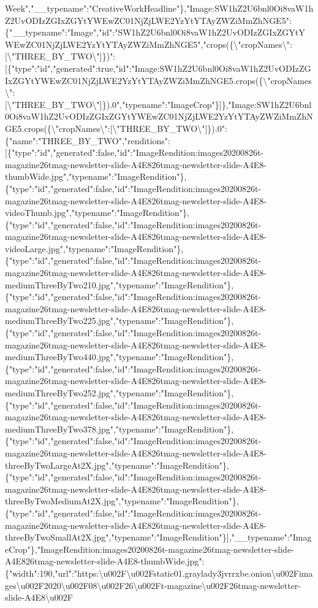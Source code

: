 Week","\_\_typename":"CreativeWorkHeadline"\},"Image:SW1hZ2U6bnl0Oi8vaW1hZ2UvODIzZGIxZGYtYWEwZC01NjZjLWE2YzYtYTAyZWZiMmZhNGE5":\{"\_\_typename":"Image","id":"SW1hZ2U6bnl0Oi8vaW1hZ2UvODIzZGIxZGYtYWEwZC01NjZjLWE2YzYtYTAyZWZiMmZhNGE5","crops(\{\textbackslash{}"cropNames\textbackslash{}":{[}\textbackslash{}"THREE\_BY\_TWO\textbackslash{}"{]}\})":{[}\{"type":"id","generated":true,"id":"Image:SW1hZ2U6bnl0Oi8vaW1hZ2UvODIzZGIxZGYtYWEwZC01NjZjLWE2YzYtYTAyZWZiMmZhNGE5.crops(\{\textbackslash{}"cropNames\textbackslash{}":{[}\textbackslash{}"THREE\_BY\_TWO\textbackslash{}"{]}\}).0","typename":"ImageCrop"\}{]}\},"Image:SW1hZ2U6bnl0Oi8vaW1hZ2UvODIzZGIxZGYtYWEwZC01NjZjLWE2YzYtYTAyZWZiMmZhNGE5.crops(\{\textbackslash{}"cropNames\textbackslash{}":{[}\textbackslash{}"THREE\_BY\_TWO\textbackslash{}"{]}\}).0":\{"name":"THREE\_BY\_TWO","renditions":{[}\{"type":"id","generated":false,"id":"ImageRendition:images20200826t-magazine26tmag-newsletter-slide-A4E826tmag-newsletter-slide-A4E8-thumbWide.jpg","typename":"ImageRendition"\},\{"type":"id","generated":false,"id":"ImageRendition:images20200826t-magazine26tmag-newsletter-slide-A4E826tmag-newsletter-slide-A4E8-videoThumb.jpg","typename":"ImageRendition"\},\{"type":"id","generated":false,"id":"ImageRendition:images20200826t-magazine26tmag-newsletter-slide-A4E826tmag-newsletter-slide-A4E8-videoLarge.jpg","typename":"ImageRendition"\},\{"type":"id","generated":false,"id":"ImageRendition:images20200826t-magazine26tmag-newsletter-slide-A4E826tmag-newsletter-slide-A4E8-mediumThreeByTwo210.jpg","typename":"ImageRendition"\},\{"type":"id","generated":false,"id":"ImageRendition:images20200826t-magazine26tmag-newsletter-slide-A4E826tmag-newsletter-slide-A4E8-mediumThreeByTwo225.jpg","typename":"ImageRendition"\},\{"type":"id","generated":false,"id":"ImageRendition:images20200826t-magazine26tmag-newsletter-slide-A4E826tmag-newsletter-slide-A4E8-mediumThreeByTwo440.jpg","typename":"ImageRendition"\},\{"type":"id","generated":false,"id":"ImageRendition:images20200826t-magazine26tmag-newsletter-slide-A4E826tmag-newsletter-slide-A4E8-mediumThreeByTwo252.jpg","typename":"ImageRendition"\},\{"type":"id","generated":false,"id":"ImageRendition:images20200826t-magazine26tmag-newsletter-slide-A4E826tmag-newsletter-slide-A4E8-mediumThreeByTwo378.jpg","typename":"ImageRendition"\},\{"type":"id","generated":false,"id":"ImageRendition:images20200826t-magazine26tmag-newsletter-slide-A4E826tmag-newsletter-slide-A4E8-threeByTwoLargeAt2X.jpg","typename":"ImageRendition"\},\{"type":"id","generated":false,"id":"ImageRendition:images20200826t-magazine26tmag-newsletter-slide-A4E826tmag-newsletter-slide-A4E8-threeByTwoMediumAt2X.jpg","typename":"ImageRendition"\},\{"type":"id","generated":false,"id":"ImageRendition:images20200826t-magazine26tmag-newsletter-slide-A4E826tmag-newsletter-slide-A4E8-threeByTwoSmallAt2X.jpg","typename":"ImageRendition"\}{]},"\_\_typename":"ImageCrop"\},"ImageRendition:images20200826t-magazine26tmag-newsletter-slide-A4E826tmag-newsletter-slide-A4E8-thumbWide.jpg":\{"width":190,"url":"https:\textbackslash{}u002F\textbackslash{}u002Fstatic01.graylady3jvrrxbe.onion\textbackslash{}u002Fimages\textbackslash{}u002F2020\textbackslash{}u002F08\textbackslash{}u002F26\textbackslash{}u002Ft-magazine\textbackslash{}u002F26tmag-newsletter-slide-A4E8\textbackslash{}u002F